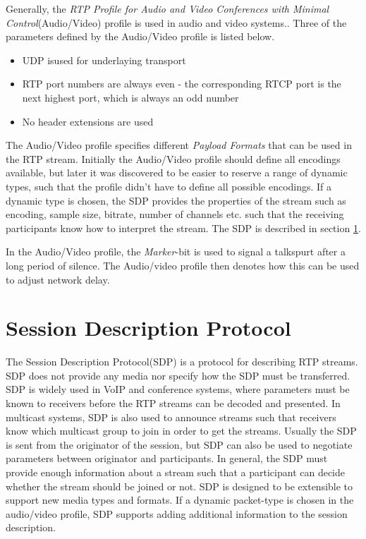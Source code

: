 Generally, the \textit{RTP Profile for Audio and Video Conferences with Minimal Control}\citep{RFC3551}(Audio/Video) profile is used in audio and video systems.\citep{perkins2003rtp}.
Three of the parameters defined by the Audio/Video profile is listed below.
\begin{itemize}
	\item UDP isused for underlaying transport
	\item RTP port numbers are always even - the corresponding RTCP port is the next highest port, which is always an odd number
	\item No header extensions are used
\end{itemize} \citep{johnston2004sip}

The Audio/Video profile specifies different \textit{Payload Formats} that can be used in the RTP stream. Initially the Audio/Video profile should define all encodings available, but later it was discovered to be easier to reserve a range of dynamic types, such that the profile didn't have to define all possible encodings. If a dynamic type is chosen, the SDP provides the properties of the stream such as encoding, sample size, bitrate, number of channels etc. such that the receiving participants know how to interpret the stream.
The SDP is described in section \ref{sec:design:sdp}.

In the Audio/Video profile, the \textit{Marker}-bit is used to signal a talkspurt after a long period of silence. The Audio/video profile then denotes how this can be used to adjust network delay.

\section{Session Description Protocol} \label{sec:design:sdp}
The Session Description Protocol(SDP) is a protocol for describing RTP streams.
SDP does not provide any media nor specify how the SDP must be transferred.
SDP is widely used in VoIP and conference systems, where parameters must be known to receivers before the RTP streams can be decoded and presented. In multicast systems, SDP is also used to announce streams such that receivers know which multicast group to join in order to get the streams. Usually the SDP is sent from the originator of the session, but SDP can also be used to negotiate parameters between originator and participants. In general, the SDP must provide enough information about a stream such that a participant can decide whether the stream should be joined or not.  SDP is designed to be extensible to support new media types and formats. If a dynamic packet-type is chosen in the audio/video profile, SDP supports adding additional information to the session description. 

